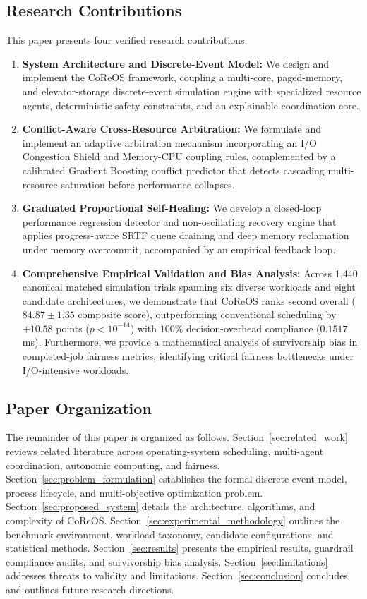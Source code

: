 \documentclass[conference]{IEEEtran}
\begin{document}
\subsection{Research Contributions}
This paper presents four verified research contributions:
\begin{enumerate}
    \item \textbf{System Architecture and Discrete-Event Model:} We design and implement the CoReOS framework, coupling a multi-core, paged-memory, and elevator-storage discrete-event simulation engine with specialized resource agents, deterministic safety constraints, and an explainable coordination core.
    \item \textbf{Conflict-Aware Cross-Resource Arbitration:} We formulate and implement an adaptive arbitration mechanism incorporating an I/O Congestion Shield and Memory-CPU coupling rules, complemented by a calibrated Gradient Boosting conflict predictor that detects cascading multi-resource saturation before performance collapses.
    \item \textbf{Graduated Proportional Self-Healing:} We develop a closed-loop performance regression detector and non-oscillating recovery engine that applies progress-aware SRTF queue draining and deep memory reclamation under memory overcommit, accompanied by an empirical feedback loop.
    \item \textbf{Comprehensive Empirical Validation and Bias Analysis:} Across 1,440 canonical matched simulation trials spanning six diverse workloads and eight candidate architectures, we demonstrate that CoReOS ranks second overall ($84.87 \pm 1.35$ composite score), outperforming conventional scheduling by $+10.58$ points ($p < 10^{-14}$) with $100\%$ decision-overhead compliance ($0.1517$\,ms). Furthermore, we provide a mathematical analysis of survivorship bias in completed-job fairness metrics, identifying critical fairness bottlenecks under I/O-intensive workloads.
\end{enumerate}

\subsection{Paper Organization}
The remainder of this paper is organized as follows. Section~\ref{sec:related_work} reviews related literature across operating-system scheduling, multi-agent coordination, autonomic computing, and fairness. Section~\ref{sec:problem_formulation} establishes the formal discrete-event model, process lifecycle, and multi-objective optimization problem. Section~\ref{sec:proposed_system} details the architecture, algorithms, and complexity of CoReOS. Section~\ref{sec:experimental_methodology} outlines the benchmark environment, workload taxonomy, candidate configurations, and statistical methods. Section~\ref{sec:results} presents the empirical results, guardrail compliance audits, and survivorship bias analysis. Section~\ref{sec:limitations} addresses threats to validity and limitations. Section~\ref{sec:conclusion} concludes and outlines future research directions.
\end{document}
